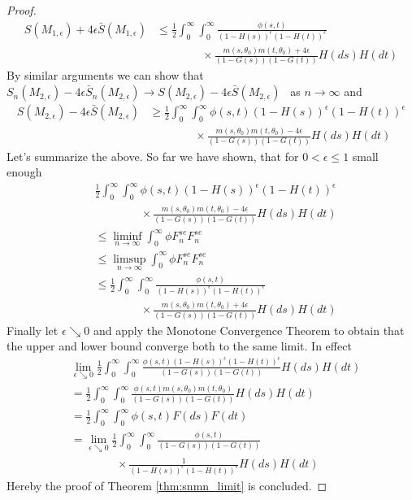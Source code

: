 \begin{thm}
\begin{proof}
		\begin{align*}
			S(M_{1,\epsilon}) + 4\epsilon \bar{S}(M_{1,\epsilon}) &\leq \frac{1}{2}\int_{0}^{\infty} \int_{0}^{\infty} \frac{\phi(s,t)}{(1-H(s))^\epsilon(1-H(t))^\epsilon}\\
			&\qquad\qquad \times \frac{m(s,\theta_0)m(t,\theta_0) + 4\epsilon}{(1-G(s))(1-G(t))} H(ds)H(dt)
		\end{align*}
		By similar arguments we can show that $S_n(M_{2,\epsilon}) - 4\epsilon \bar{S}_n(M_{2,\epsilon}) \to S(M_{2,\epsilon}) - 4\epsilon \bar{S}(M_{2,\epsilon})$ \wpo\ as $n\to\infty$ and 
		\begin{align*}
			S(M_{2,\epsilon}) - 4\epsilon \bar{S}(M_{2,\epsilon}) &\geq \frac{1}{2}\int_{0}^{\infty} \int_{0}^{\infty} \phi(s,t)(1-H(s))^\epsilon(1-H(t))^\epsilon\\
			&\qquad\qquad \times \frac{m(s,\theta_0)m(t,\theta_0) - 4\epsilon}{(1-G(s))(1-G(t))} H(ds)H(dt)
		\end{align*}
		Let's summarize the above. So far we have shown, that for $0<\epsilon\leq 1$ small enough
		\begin{align*}
			&\frac{1}{2}\int_{0}^{\infty} \int_{0}^{\infty} \phi(s,t)(1-H(s))^\epsilon(1-H(t))^\epsilon\\
			&\qquad\qquad \times \frac{m(s,\theta_0)m(t,\theta_0) - 4\epsilon}{(1-G(s))(1-G(t))} H(ds)H(dt)\\
			&\leq \liminf_{n\to\infty} \int_{0}^{\infty} \phi F_n^{se} F_n^{se}\\
			&\leq \limsup_{n\to\infty} \int_{0}^{\infty} \phi F_n^{se} F_n^{se}\\
			&\leq \frac{1}{2}\int_{0}^{\infty} \int_{0}^{\infty} \frac{\phi(s,t)}{(1-H(s))^\epsilon(1-H(t))^\epsilon}\\
			&\qquad\qquad \times \frac{m(s,\theta_0)m(t,\theta_0) + 4\epsilon}{(1-G(s))(1-G(t))} H(ds)H(dt)
		\end{align*}
		Finally let $\epsilon \searrow 0$ and apply the Monotone Convergence Theorem to obtain that the upper and lower bound converge both to the same limit. In effect
		\begin{align*}
			&\lim\limits_{\epsilon\searrow 0}\frac{1}{2}\int_{0}^{\infty} \int_{0}^{\infty} \frac{\phi(s,t)(1-H(s))^\epsilon(1-H(t))^\epsilon}{(1-G(s))(1-G(t))} H(ds)H(dt)\\
			&= \frac{1}{2}\int_{0}^{\infty} \int_{0}^{\infty} \frac{\phi(s,t)m(s,\theta_0)m(t,\theta_0)}{(1-G(s))(1-G(t))} H(ds)H(dt)\\
			&= \frac{1}{2}\int_{0}^{\infty} \int_{0}^{\infty} \phi(s,t)F(ds)F(dt)\\
			&= \lim\limits_{\epsilon\searrow 0} \frac{1}{2}\int_{0}^{\infty} \int_{0}^{\infty} \frac{\phi(s,t)}{(1-G(s))(1-G(t))}\\
			&\qquad\qquad \times \frac{1}{(1-H(s))^\epsilon(1-H(t))^\epsilon} H(ds)H(dt)
		\end{align*}
		Hereby the proof of Theorem \ref{thm:snmn_limit} is concluded. 
	\end{proof}
\end{thm}
